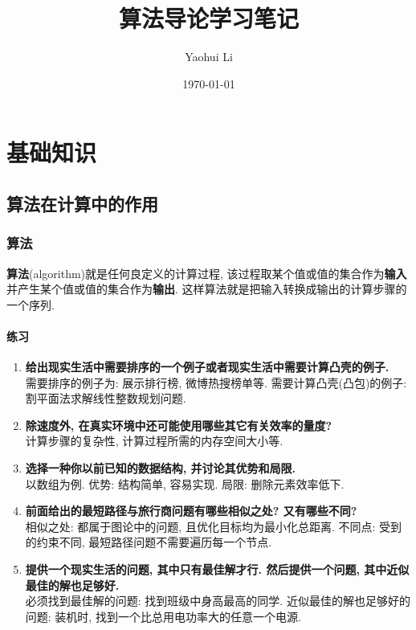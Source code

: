 \documentclass[UTF8,a4paper,zihao=-4,oneside,onecolumn,scheme=chinese,autoindent=true]{ctexbook}
\title{算法导论学习笔记}
\author{Yaohui Li}
\date{\today}
\begin{document}
\maketitle

\tableofcontents

\part{基础知识}

\chapter{算法在计算中的作用}
\section{算法}
\textbf{算法}(algorithm)就是任何良定义的计算过程, 该过程取某个值或值的集合作为\textbf{输入}并产生某个值或值的集合作为\textbf{输出}. 这样算法就是把输入转换成输出的计算步骤的一个序列.

\subsection*{练习}
\begin{enumerate}
    \renewcommand{\labelenumi}{\thesection-\theenumi}
    \item {\textbf{给出现实生活中需要排序的一个例子或者现实生活中需要计算凸壳的例子. }\\需要排序的例子为: 展示排行榜, 微博热搜榜单等. 需要计算凸壳(凸包)的例子: 割平面法求解线性整数规划问题. }
    \item {\textbf{除速度外, 在真实环境中还可能使用哪些其它有关效率的量度? }\\计算步骤的复杂性, 计算过程所需的内存空间大小等. }
    \item {\textbf{选择一种你以前已知的数据结构, 并讨论其优势和局限. }\\以数组为例. 优势: 结构简单, 容易实现. 局限: 删除元素效率低下. }
    \item {\textbf{前面给出的最短路径与旅行商问题有哪些相似之处? 又有哪些不同? }\\相似之处: 都属于图论中的问题, 且优化目标均为最小化总距离. 不同点: 受到的约束不同, 最短路径问题不需要遍历每一个节点. }
    \item {\textbf{提供一个现实生活的问题, 其中只有最佳解才行. 然后提供一个问题, 其中近似最佳的解也足够好. }\\必须找到最佳解的问题: 找到班级中身高最高的同学. 近似最佳的解也足够好的问题: 装机时, 找到一个比总用电功率大的任意一个电源. }
\end{enumerate}
\end{document}
